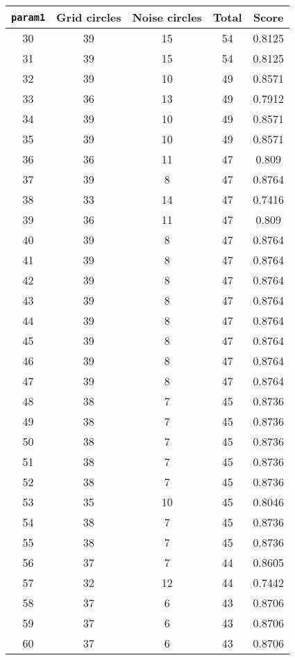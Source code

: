 \documentclass[letterpaper, 12pt]{article}
\begin{document}
\begin{longtable}{|c|c|c|c|c|}
\hline
\textbf{\texttt{param1}} & \textbf{Grid circles} & \textbf{Noise circles} & \textbf{Total} & \textbf{Score} \\
\hline
30 & 39 & 15 & 54 & 0.8125 \\
\hline
31 & 39 & 15 & 54 & 0.8125 \\
\hline
32 & 39 & 10 & 49 & 0.8571 \\
\hline
33 & 36 & 13 & 49 & 0.7912 \\
\hline
34 & 39 & 10 & 49 & 0.8571 \\
\hline
35 & 39 & 10 & 49 & 0.8571 \\
\hline
36 & 36 & 11 & 47 & 0.809 \\
\hline
37 & 39 & 8 & 47 & 0.8764 \\
\hline
38 & 33 & 14 & 47 & 0.7416 \\
\hline
39 & 36 & 11 & 47 & 0.809 \\
\hline
40 & 39 & 8 & 47 & 0.8764 \\
\hline
41 & 39 & 8 & 47 & 0.8764 \\
\hline
42 & 39 & 8 & 47 & 0.8764 \\
\hline
43 & 39 & 8 & 47 & 0.8764 \\
\hline
44 & 39 & 8 & 47 & 0.8764 \\
\hline
45 & 39 & 8 & 47 & 0.8764 \\
\hline
46 & 39 & 8 & 47 & 0.8764 \\
\hline
47 & 39 & 8 & 47 & 0.8764 \\
\hline
48 & 38 & 7 & 45 & 0.8736 \\
\hline
49 & 38 & 7 & 45 & 0.8736 \\
\hline
50 & 38 & 7 & 45 & 0.8736 \\
\hline
51 & 38 & 7 & 45 & 0.8736 \\
\hline
52 & 38 & 7 & 45 & 0.8736 \\
\hline
53 & 35 & 10 & 45 & 0.8046 \\
\hline
54 & 38 & 7 & 45 & 0.8736 \\
\hline
55 & 38 & 7 & 45 & 0.8736 \\
\hline
56 & 37 & 7 & 44 & 0.8605 \\
\hline
57 & 32 & 12 & 44 & 0.7442 \\
\hline
58 & 37 & 6 & 43 & 0.8706 \\
\hline
59 & 37 & 6 & 43 & 0.8706 \\
\hline
60 & 37 & 6 & 43 & 0.8706 \\
\hline

\end{longtable}
\end{document}
